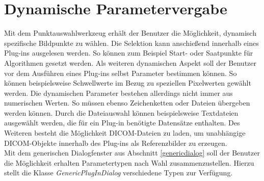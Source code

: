 \section{Dynamische Parametervergabe}

Mit dem Punktauswahlwerkzeug erhält der Benutzer die Möglichkeit, dynamisch spezifische Bildpunkte zu wählen. Die Selektion kann anschießend innerhalb eines Plug-ins ausgelesen werden. So können zum Beispiel Start- oder Saatpunkte für Algorithmen gesetzt werden. Als weiteren dynamischen Aspekt soll der Benutzer vor dem Ausführen eines Plug-ins selbst Parameter bestimmen können. So können beispielsweise Schwellwerte im Bezug zu speziellen Pixelwerten gewählt werden. Die dynamischen Parameter bestehen allerdings nicht immer aus numerischen Werten. So müssen ebenso Zeichenketten oder Dateien übergeben werden können. Durch die Dateiauswahl können beispielsweise Textdateien ausgewählt werden, die für ein Plug-in benötigte Datensätze enthalten. Des Weiteren besteht die Möglichkeit DICOM-Dateien zu laden, um unabhängige DICOM-Objekte innerhalb des Plug-ins als Referenzbilder zu erzeugen.\\
Mit dem generischen Dialogfenster aus Abschnitt \ref{genericdialog} soll der Benutzer die Möglichkeit erhalten Parametertypen nach Wahl zusammenzustellen. Hierzu stellt die Klasse \textit{GenericPlugInDialog} verschiedene Typen zur Verfügung.

